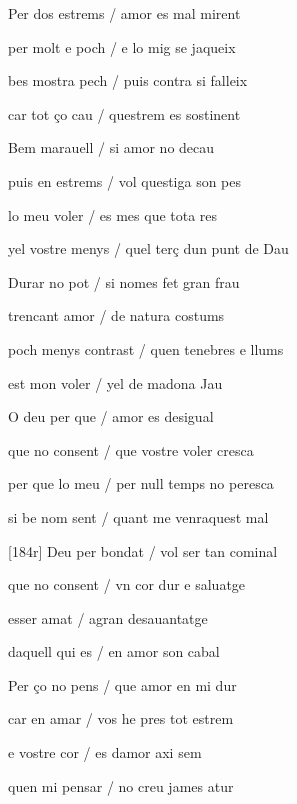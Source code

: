 \documentclass[12pt]{article}
\begin{document}
\begin{estrofa}

 Per dos estrems / amor es mal mirent

 per molt e poch / e lo mig se jaqueix

 bes mostra pech / puis contra si falleix

 car tot \c{c}o cau / questrem es sostinent

 Bem marauell / si amor no decau

 puis en estrems / vol questiga son pes

 lo meu voler / es mes que tota res

 yel vostre menys / quel ter\c{c} dun punt de Dau

\end{estrofa}



\begin{estrofa}

 Durar no pot / si nomes fet gran frau

 trencant amor / de natura costums

 poch menys contrast / quen tenebres e llums

 est mon voler / yel de madona Jau

 O deu per que / amor es desigual

 que no consent / que vostre voler cresca

 per que lo meu / per null temps no peresca

 si be nom sent / quant me venraquest mal

\end{estrofa}



\begin{estrofa}

 [184r] Deu per bondat / vol ser tan cominal

 que no consent / vn cor dur e saluatge

 esser amat / agran desauantatge

 daquell qui es / en amor son cabal

 Per \c{c}o no pens / que amor en mi dur

 car en amar / vos he pres tot estrem

 e vostre cor / es damor axi sem

 quen mi pensar / no creu james atur

\end{estrofa}
\end{document}
